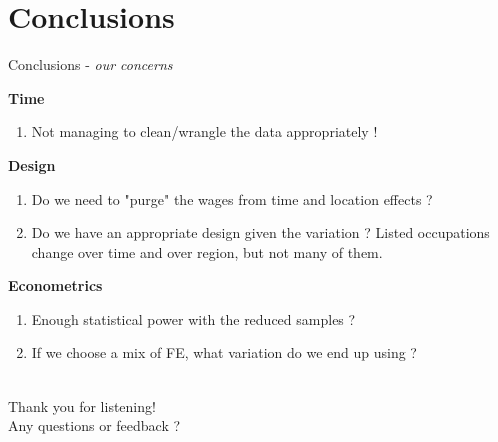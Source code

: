 \documentclass[aspectratio=169,10pt,xcolor={dvipsnames}]{beamer}
\begin{document}
\section*{Conclusions}
\begin{frame}{Conclusions - \textit{our concerns}}

\alert{\textbf{Time}}
\begin{enumerate}
	\item Not managing to clean/wrangle the data appropriately !
\end{enumerate}
\vspace{0.2cm}

\alert{\textbf{Design}}
\begin{enumerate}
	\item Do we need to "purge" the wages from time and location effects ?
	\item Do we have an appropriate design given the variation ? Listed occupations change over time and over region, but not many of them.
\end{enumerate}
\vspace{0.2cm}


\alert{\textbf{Econometrics}}
\begin{enumerate}
	\item Enough statistical power with the reduced samples ?
	\item If we choose a mix of FE, what variation do we end up using ? 
\end{enumerate}
\end{frame}

\begin{frame}
		\thispagestyle{empty}
		\begin{center}
			\textit{}\\
			{ \huge
				\vspace{1.3cm}
				\alert{Thank you for listening!}}\\
			\vspace{0.6cm} {\large \alert{Any questions or feedback ?}} \\
			\vspace{1.3cm}
			\textbf{} \\
			\vspace{0.8cm}
		\end{center}
	\end{frame}
\end{document}
